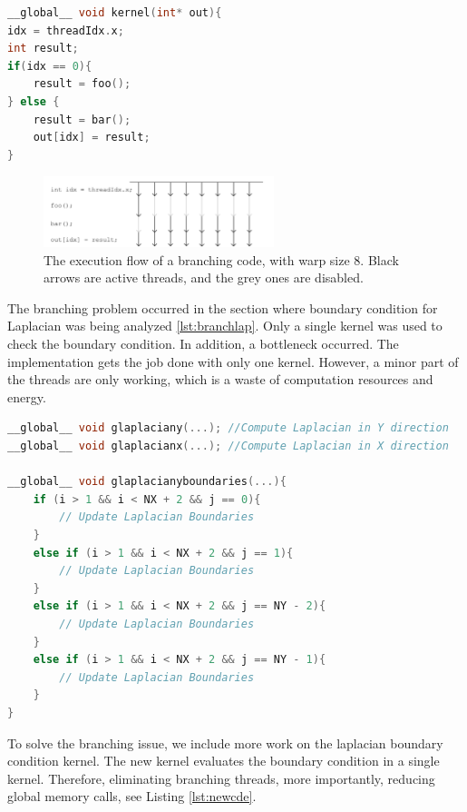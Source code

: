 \begin{lstlisting}[language=C++, label={lst:branch}, caption={Branching threads}]
__global__ void kernel(int* out){
idx = threadIdx.x;
int result;
if(idx == 0){
	result = foo();
} else {
	result = bar();
	out[idx] = result;
}
\end{lstlisting}

\begin{figure}[htbp]
	\centering
		\includegraphics[width=0.6\textwidth]{Figures/threads.png}
		\smallskip
	\caption[he execution flow]{The execution flow of a branching code, with warp size 8. Black arrows are active threads, and the grey ones are disabled.}
	\label{fig:threads}
\end{figure}

The branching problem occurred in the section where boundary condition for Laplacian was being analyzed \ref{lst:branchlap}. Only a single kernel was used to check the boundary condition. In addition, a bottleneck occurred. The implementation gets the job done with only one kernel. However, a minor part of the threads are only working, which is a waste of computation resources and energy.

\begin{lstlisting}[language=C++, label={lst:branchlap}, caption={Branching problem in the Laplacian boundary condition evaluation}]
__global__ void glaplaciany(...); //Compute Laplacian in Y direction
__global__ void glaplacianx(...); //Compute Laplacian in X direction

__global__ void glaplacianyboundaries(...){
    if (i > 1 && i < NX + 2 && j == 0){
     	// Update Laplacian Boundaries
    }
    else if (i > 1 && i < NX + 2 && j == 1){
  		// Update Laplacian Boundaries
  	}
    else if (i > 1 && i < NX + 2 && j == NY - 2){
        // Update Laplacian Boundaries
    }
    else if (i > 1 && i < NX + 2 && j == NY - 1){
        // Update Laplacian Boundaries
    }
}
\end{lstlisting}

To solve the branching issue, we include more work on the laplacian boundary condition kernel. The new kernel evaluates the boundary condition in a single kernel. Therefore, eliminating branching threads, more importantly, reducing global memory calls, see Listing \ref{lst:newcde}.

